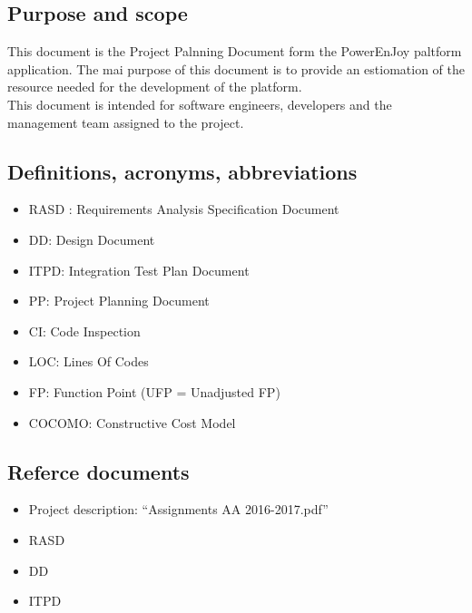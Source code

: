 \subsection{Purpose and scope}
This document is the Project Palnning Document form the PowerEnJoy paltform application. The mai purpose of this document is to provide an estiomation of the resource needed for the development of the platform.\\
This document is intended for software engineers, developers and the management team assigned to the project.\\

\subsection{Definitions, acronyms, abbreviations}
\begin{itemize}
		\item RASD : Requirements Analysis Specification Document
	 	\item DD: Design Document
	 	\item ITPD: Integration Test Plan Document
	 	\item PP: Project Planning Document
	 	\item CI: Code Inspection
		\item LOC: Lines Of Codes
		\item FP: Function Point (UFP = Unadjusted FP)
		\item COCOMO: Constructive Cost Model 
\end{itemize}

\subsection{Referce documents}
\begin{itemize}
		\item Project description: “Assignments AA 2016-2017.pdf”
	 	\item RASD
	 	\item DD
	 	\item ITPD
\end{itemize}
